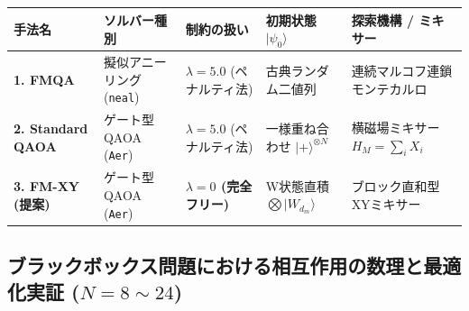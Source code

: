 \documentclass[11pt,a4paper]{ltjsarticle}
\newcommand{\ket}[1]{|#1\rangle}
\begin{document}
\vspace{-3mm}
\begin{center}
\label{tab:methods}
\vspace{0.2mm}
\scriptsize
\renewcommand{\arraystretch}{0.75}
\begin{tabularx}{\textwidth}{l p{3.2cm} p{2.8cm} p{2.8cm} X}
\toprule
\textbf{手法名} & \textbf{ソルバー種別} & \textbf{制約の扱い} & \textbf{初期状態 $\ket{\psi_0}$} & \textbf{探索機構 / ミキサー} \\
\midrule
\textbf{1. FMQA} & 擬似アニーリング (\texttt{neal}) & $\lambda = 5.0$ (ペナルティ法) & 古典ランダム二値列 & 連続マルコフ連鎖モンテカルロ \\
\textbf{2. Standard QAOA} & ゲート型QAOA (\texttt{Aer}) & $\lambda = 5.0$ (ペナルティ法) & 一様重ね合わせ $\ket{+}^{\otimes N}$ & 横磁場ミキサー $H_M = \sum_i X_i$ \\
\textbf{3. FM-XY (提案)} & ゲート型QAOA (\texttt{Aer}) & \textbf{$\lambda = 0$ (完全フリー)} & W状態直積 $\bigotimes \ket{W_{d_m}}$ & ブロック直和型XYミキサー \\
\bottomrule
\end{tabularx}
\end{center}

\vspace{-3.5mm}
\subsection{ブラックボックス問題における相互作用の数理と最適化実証 ($N=8 \sim 24$)}
\label{sec:interaction_nature}
\vspace{-1.5mm}
\end{document}

